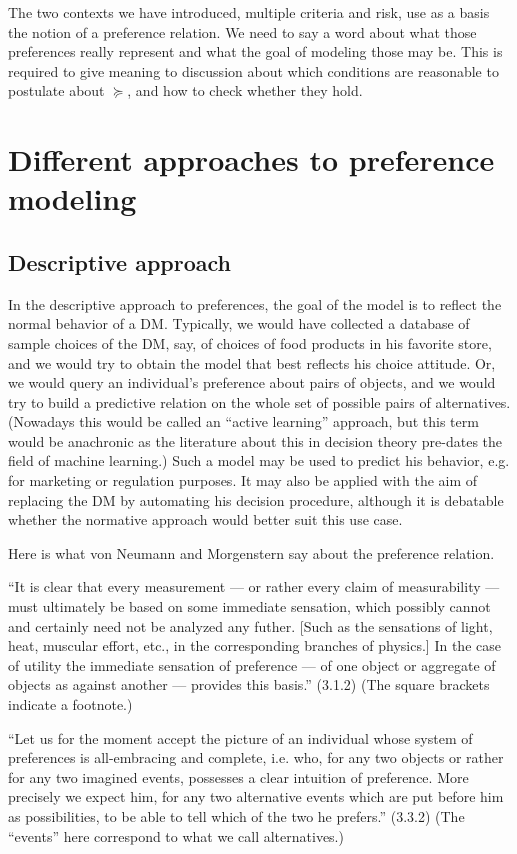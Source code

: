 \documentclass[french, english]{llncs}
\begin{document}
	The two contexts we have introduced, multiple criteria and risk, use as a basis the notion of a preference relation. We need to say a word about what those preferences really represent and what the goal of modeling those may be. This is required to give meaning to discussion about which conditions are reasonable to postulate about $\succeq$, and how to check whether they hold.
	
	\section{Different approaches to preference modeling}
	\subsection{Descriptive approach}
	In the descriptive approach to preferences, the goal of the model is to reflect the normal behavior of a \ac{DM}. Typically, we would have collected a database of sample choices of the \ac{DM}, say, of choices of food products in his favorite store, and we would try to obtain the model that best reflects his choice attitude. Or, we would query an individual’s preference about pairs of objects, and we would try to build a predictive relation on the whole set of possible pairs of alternatives. (Nowadays this would be called an “active learning” approach, but this term would be anachronic as the literature about this in decision theory pre-dates the field of machine learning.) Such a model may be used to predict his behavior, e.g. for marketing or regulation purposes. It may also be applied with the aim of replacing the \ac{DM} by automating his decision procedure, although it is debatable whether the normative approach would better suit this use case.
	
	Here is what von Neumann and Morgenstern say about the preference relation.
	
	“It is clear that every measurement --- or rather every claim of measurability --- must ultimately be based on some immediate sensation, which possibly cannot and certainly need not be analyzed any futher.
	[Such as the sensations of light, heat, muscular effort, etc., in the corresponding branches of physics.] 
	In the case of utility the immediate sensation of preference --- of one object or aggregate of objects as against another --- provides this basis.” (3.1.2) (The square brackets indicate a footnote.)
	
	“Let us for the moment accept the picture of an individual whose system of preferences is all-embracing and complete, i.e. who, for any two objects or rather for any two imagined events, possesses a clear intuition of preference. More precisely we expect him, for any two alternative events which are put before him as possibilities, to be able to tell which of the two he prefers.” (3.3.2) (The “events” here correspond to what we call alternatives.)
	
\end{document}
